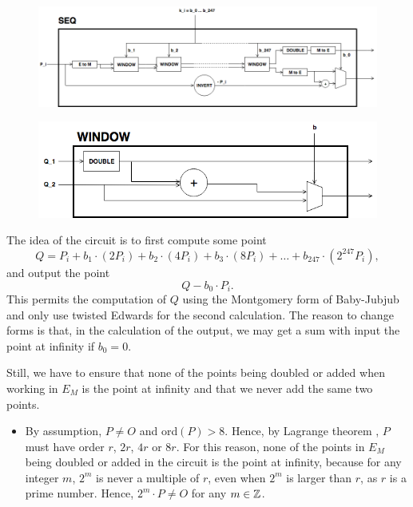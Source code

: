 \begin{enumerate}
	\begin{figure}[h]
		\centering
		\includegraphics[scale=0.43]{figures/multiplication-SEQ.png}\\
		\vspace{0.5cm}
		
		\includegraphics[scale=0.45]{figures/multiplication-SEQ-window.png}
		\vspace{0.3cm}
	\end{figure}

	The idea of the circuit is to first compute some point 		
		$$	Q = P_i + b_1 \cdot (2P_i) + b_2 \cdot (4P_i) 
				+ b_3 \cdot (8P_i) + \dots + b_{247} \cdot (2^{247}P_i), $$
	and output the point
		$$ Q - b_0 \cdot P_i. $$
	This permits the computation of $Q$ using the Montgomery form of Baby-Jubjub and only use twisted Edwards for the second calculation. The reason to change forms is that, in the calculation of the output, we may get a sum with input the point at infinity if $b_0 = 0$. 

	Still, we have to ensure that none of the points being doubled or added when working in $E_M$ is the point at infinity and that we never add the same two points. 

	\begin{itemize}
		
		\item By assumption, $P\not= O$ and ord$(P)>8$. Hence, by Lagrange theorem {\cite[Corollary 4.12]{lagrange}}, $P$ must have order $r$, $2r$, $4r$ or $8r$. 
		For this reason, none of the points in $E_M$ being doubled or added in the circuit is the point at infinity, because for any integer $m$,  $2^m$ is never a multiple of $r$, even when $2^m$ is larger than $r$, as $r$ is a prime number. Hence, $2^m \cdot P \not= O$ for any $m\in\mathbb{Z}$.		


\end{itemize}
\end{enumerate}
